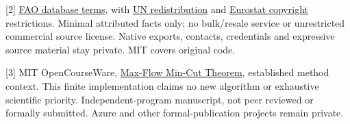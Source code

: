 \documentclass[11pt,letterpaper]{article}
\begin{document}
[2] \href{https://www.fao.org/contact-us/terms/db-terms-of-use/en/}{FAO database terms}, with \href{https://uncomtrade.org/docs/re-dissemination-of-data/}{UN redistribution} and \href{https://ec.europa.eu/eurostat/help/copyright-notice}{Eurostat copyright} restrictions. Minimal attributed facts only; no bulk/resale service or unrestricted commercial source license. Native exports, contacts, credentials and expressive source material stay private. MIT covers original code.

[3] MIT OpenCourseWare, \href{https://ocw.mit.edu/courses/18-200-principles-of-discrete-applied-mathematics-spring-2024/resources/18200-lecture-15-version-2_mp4/}{Max-Flow Min-Cut Theorem}, established method context. This finite implementation claims no new algorithm or exhaustive scientific priority. Independent-program manuscript, not peer reviewed or formally submitted. Azure and other formal-publication projects remain private.
\end{document}
